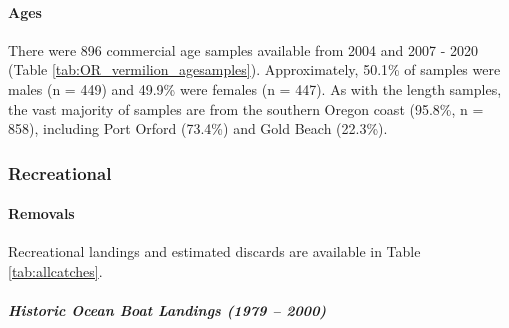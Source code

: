 \documentclass[11pt,
  english,
  a4paper,
]{article}
\begin{document}
\leavevmode\tagmcend\tagstructend\par


\hypertarget{ages}{%
\paragraph{Ages}\label{ages}}

\leavevmode\tagmcend\tagstructend


There were 896 commercial age samples available from 2004 and 2007 - 2020 (Table \ref{tab:OR_vermilion_agesamples}). Approximately, 50.1\% of samples were males (n = 449) and 49.9\% were females (n = 447). As with the length samples, the vast majority of samples are from the southern Oregon coast (95.8\%, n = 858), including Port Orford (73.4\%) and Gold Beach (22.3\%).

\leavevmode\tagmcend\tagstructend\par


\hypertarget{recreational}{%
\subsubsection{Recreational}\label{recreational}}

\leavevmode\tagmcend\tagstructend


\hypertarget{removals}{%
\paragraph{Removals}\label{removals}}

\leavevmode\tagmcend\tagstructend


Recreational landings and estimated discards are available in Table \ref{tab:allcatches}.

\leavevmode\tagmcend\tagstructend\par


\hypertarget{historic-ocean-boat-landings-1979-2000}{%
\subparagraph{Historic Ocean Boat Landings (1979 -- 2000)}\label{historic-ocean-boat-landings-1979-2000}}
\end{document}
